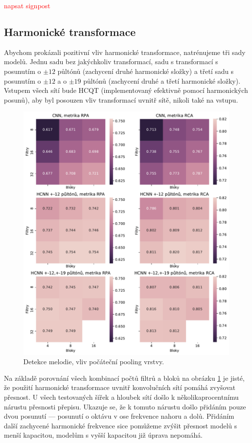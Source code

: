 \textcolor{red}{napsat signpost}

\subsection{Harmonické transformace}

Abychom prokázali pozitivní vliv harmonické transformace, natrénujeme tři sady modelů. Jednu sadu bez jakýchkoliv transformací, sadu s transformací s posunutím o $\pm 12$ půltónů (zachycení druhé harmonické složky) a třetí sadu s posunutím o $\pm 12$ a o $\pm 19$ půltónů (zachycení druhé a třetí harmonické složky). Vstupem všech sítí bude HCQT (implementovaný efektivně pomocí harmonických posunů), aby byl posouzen vliv transformací uvnitř sítě, nikoli také na vstupu.

\begin{figure}[h!]\centering
    \includegraphics[scale=0.65]{../img/figures/spectrogram_harmonic_stacking}
\caption{Detekce melodie, vliv počáteční pooling vrstvy.}\label{obr:spectrogram_harmonic_stacking}
\end{figure}

Na základě porovnání všech kombinací počtů filtrů a bloků na obrázku \ref{obr:spectrogram_harmonic_stacking} je jisté, že použití harmonické transformace uvnitř konvolučních sítí pomáhá zvyšovat přesnost. U všech testovaných šířek a hloubek sítí došlo k několikaprocentnímu nárustu přesnosti přepisu. Ukazuje se, že k tomuto nárustu došlo přidáním pouze dvou posunutí --- posunutí o oktávu v ose frekvence nahoru a dolů. Přidáním další zachycené harmonické frekvence sice pomůžeme zvýšit přesnost modelů s menší kapacitou, modelům s vyšší kapacitou již úprava nepomáhá. 

